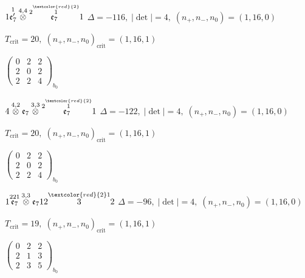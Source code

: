 \documentclass[10pt]{article}
\begin{document}
\smallskip

$1\overset{1}{\mathfrak{e}_7'}\overset{4,4}{\otimes}\overset{2\overset{\textcolor{red}{2}}{1}}{\mathfrak{e}_7}1$ \quad $\Delta=-116,\; |\det|=4,\; (n_+,n_-,n_0)=(1,16,0)$

\hspace{1em}$T_{\text{crit}}=20,\; (n_+,n_-,n_0)_{\text{crit}}=(1,16,1)$

\hspace{2em}$\left(\begin{smallmatrix}0 & 2 & 2 \\ 2 & 0 & 2 \\ 2 & 2 & 4\end{smallmatrix}\right)_{\!b_0}$

\smallskip

$4\overset{4,2}{\otimes}\mathfrak{e}_7\overset{3,3}{\otimes}\overset{2\overset{\textcolor{red}{2}}{1}}{\mathfrak{e}_7}1$ \quad $\Delta=-122,\; |\det|=4,\; (n_+,n_-,n_0)=(1,16,0)$

\hspace{1em}$T_{\text{crit}}=20,\; (n_+,n_-,n_0)_{\text{crit}}=(1,16,1)$

\hspace{2em}$\left(\begin{smallmatrix}0 & 2 & 2 \\ 2 & 0 & 2 \\ 2 & 2 & 4\end{smallmatrix}\right)_{\!b_0}$

\smallskip

$1\overset{221}{\mathfrak{e}_7}\overset{3,3}{\otimes}\mathfrak{e}_712\overset{\textcolor{red}{2}1}{3}2$ \quad $\Delta=-96,\; |\det|=4,\; (n_+,n_-,n_0)=(1,16,0)$

\hspace{1em}$T_{\text{crit}}=19,\; (n_+,n_-,n_0)_{\text{crit}}=(1,16,1)$

\hspace{2em}$\left(\begin{smallmatrix}0 & 2 & 2 \\ 2 & 1 & 3 \\ 2 & 3 & 5\end{smallmatrix}\right)_{\!b_0}$
\end{document}
